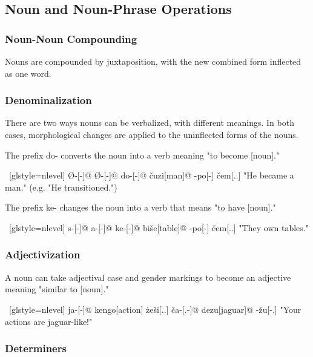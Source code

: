 \subsection{Noun and Noun-Phrase Operations}

\subsubsection{Noun-Noun Compounding}
Nouns are compounded by juxtaposition, with the new combined form inflected as one word.

\subsubsection{Denominalization}
There are two ways nouns can be verbalized, with different meanings. In both cases, morphological changes are applied to the uninflected forms of the nouns.

The prefix \textlangle do\textrangle - converts the noun into a verb meaning "to become [noun]."

\ex~[glstyle=nlevel]
\begingl
\glpreamble {}
\endpreamble
Ø-[{\Ind}-]@
Ø-[{\Pfv}-]@
do-[{\Vbz}-]@
\v{c}uzi[man]@
-po[-{\Hg}]
\v{c}em[{\T}.{\Hg}.{\Nom}]
\glft "He became a man." (e.g. "He transitioned.")
\endgl
\xe

The prefix \textlangle ke\textrangle - changes the noun into a verb that means "to have [noun]."

\ex~[glstyle=nlevel]
\begingl
\glpreamble {}
\endpreamble
s-[{\Ind}-]@
a-[{\Prog}-]@
ke-[{\Vbz}-]@
bi\v{s}e[table]@
-po[-{\Hg}]
\v{c}em[{\T}.{\Hg}.{\Nom}]
\glft "They own tables."
\endgl
\xe

\subsubsection{Adjectivization}
A noun can take adjectival case and gender markings to become an adjective meaning "similar to [noun]."

\ex~[glstyle=nlevel]
\begingl
\glpreamble {}
\endpreamble
ja-[{\Nom}-]@
kengo[action]
\.{z}e\v{s}i[{\Shum}.{\Hg}.{\Gen}]
\v{c}a-[{\Nom}.{\Adjz}-]@
dezu[jaguar]@
-\v{z}u[-{\An}.{\Adjz}]
\glft "Your actions are jaguar-like!"
\endgl
\xe

\subsubsection{Determiners}

